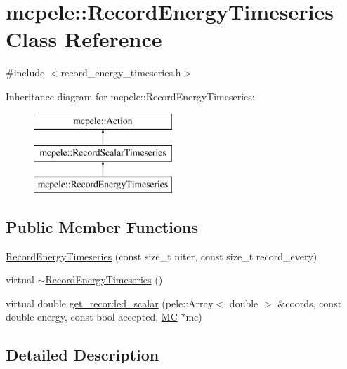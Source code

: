 \hypertarget{classmcpele_1_1RecordEnergyTimeseries}{\section{mcpele\-:\-:\-Record\-Energy\-Timeseries \-Class \-Reference}
\label{classmcpele_1_1RecordEnergyTimeseries}
}


{\ttfamily \#include $<$record\-\_\-energy\-\_\-timeseries.\-h$>$}

\-Inheritance diagram for mcpele\-:\-:\-Record\-Energy\-Timeseries\-:\begin{figure}[H]
\begin{center}
\leavevmode
\includegraphics[height=3.000000cm]{classmcpele_1_1RecordEnergyTimeseries}
\end{center}
\end{figure}
\subsection*{\-Public \-Member \-Functions}
\begin{DoxyCompactItemize}
\item 
\hyperlink{classmcpele_1_1RecordEnergyTimeseries_a5e27f7e13a2c2357016f165c75f7e5ef}{\-Record\-Energy\-Timeseries} (const size\-\_\-t niter, const size\-\_\-t record\-\_\-every)
\item 
virtual \hyperlink{classmcpele_1_1RecordEnergyTimeseries_a19a365154f144b892095ef75034e6c88}{$\sim$\-Record\-Energy\-Timeseries} ()
\item 
virtual double \hyperlink{classmcpele_1_1RecordEnergyTimeseries_a6cab4a7ab5462ee3ddf0c6eacb88b757}{get\-\_\-recorded\-\_\-scalar} (pele\-::\-Array$<$ double $>$ \&coords, const double energy, const bool accepted, \hyperlink{classmcpele_1_1MC}{\-M\-C} $\ast$mc)
\end{DoxyCompactItemize}


\subsection{\-Detailed \-Description}


